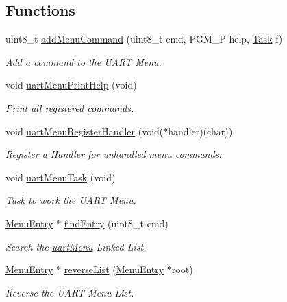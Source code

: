 \subsection*{Functions}
\begin{DoxyCompactItemize}
\item 
uint8\-\_\-t \hyperlink{group__uartmenu_gaba6c962adeaaeca40be02fb1098312ed}{add\-Menu\-Command} (uint8\-\_\-t cmd, P\-G\-M\-\_\-\-P help, \hyperlink{group__task_gaa9c5b8d3ac838189ed335dbe4ec9fa6b}{Task} f)
\begin{DoxyCompactList}\small\item\em Add a command to the U\-A\-R\-T Menu. \end{DoxyCompactList}\item 
void \hyperlink{group__uartmenu_ga82cceeb5e46aa39967600fb62d7716c6}{uart\-Menu\-Print\-Help} (void)
\begin{DoxyCompactList}\small\item\em Print all registered commands. \end{DoxyCompactList}\item 
void \hyperlink{group__uartmenu_gae3654103f924700d1f7801fcda4472b7}{uart\-Menu\-Register\-Handler} (void($\ast$handler)(char))
\begin{DoxyCompactList}\small\item\em Register a Handler for unhandled menu commands. \end{DoxyCompactList}\item 
void \hyperlink{group__uartmenu_ga9f477033e942434f7875930342d5e696}{uart\-Menu\-Task} (void)
\begin{DoxyCompactList}\small\item\em Task to work the U\-A\-R\-T Menu. \end{DoxyCompactList}\item 
\hyperlink{struct_menu_entry}{Menu\-Entry} $\ast$ \hyperlink{group__uartmenu_ga804da8899dee98e1d4499710625acf10}{find\-Entry} (uint8\-\_\-t cmd)
\begin{DoxyCompactList}\small\item\em Search the \hyperlink{group__uartmenu_gaedd623ea603861db72748b5b03859ba9}{uart\-Menu} Linked List. \end{DoxyCompactList}\item 
\hyperlink{struct_menu_entry}{Menu\-Entry} $\ast$ \hyperlink{group__uartmenu_gaf51e7f5c38d5af643af09f6e21d2a4b9}{reverse\-List} (\hyperlink{struct_menu_entry}{Menu\-Entry} $\ast$root)
\begin{DoxyCompactList}\small\item\em Reverse the U\-A\-R\-T Menu List. \end{DoxyCompactList}\end{DoxyCompactItemize}
